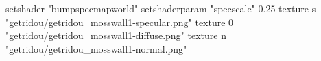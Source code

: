 setshader "bumpspecmapworld"
setshaderparam "specscale" 0.25
texture s "getridou/getridou_mosswall1-specular.png"
texture 0 "getridou/getridou_mosswall1-diffuse.png"
texture n "getridou/getridou_mosswall1-normal.png"
